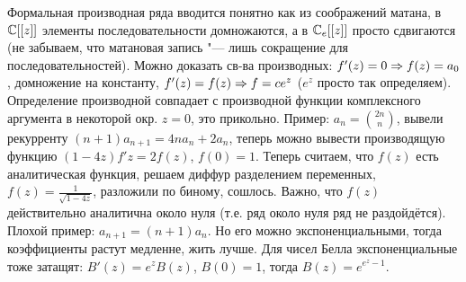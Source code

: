 Формальная производная ряда вводится понятно как из соображений матана, в $\mathbb{C}[[z]]$ элементы последовательности домножаются, а в $\mathbb{C}_e[[z]]$ просто сдвигаются
(не забываем, что матановая запись "--- лишь сокращение для последовательностей).
Можно доказать св-ва производных: $f'(z)=0 \Rightarrow f(z)=a_0$, домножение на константу, $f'(z)=f(z) \Rightarrow f=ce^z$ ($e^z$ просто так определяем).
Определение производной совпадает с производной функции комплексного аргумента в некоторой окр. $z=0$, это прикольно.
Пример: $a_n=\binom{2n}{n}$, вывели рекурренту $(n+1)a_{n+1}=4na_n+2a_n$, теперь можно вывести производящую функцию $(1-4z)f'z=2f(z)$, $f(0)=1$.
Теперь считаем, что $f(z)$ есть аналитическая функция, решаем диффур разделением переменных, $f(z)=\frac{1}{\sqrt{1-4z}}$, разложили по биному,
сошлось.
Важно, что $f(z)$ действительно аналитична около нуля (т.е. ряд около нуля ряд не раздойдётся).
Плохой пример: $a_{n+1}=(n+1)a_n$.
Но его можно экспоненциальными, тогда коэффициенты растут медленне, жить лучше.
Для чисел Белла экспоненциальные тоже затащят: $B'(z)=e^zB(z)$, $B(0)=1$, тогда $B(z)=e^{e^z-1}$.
